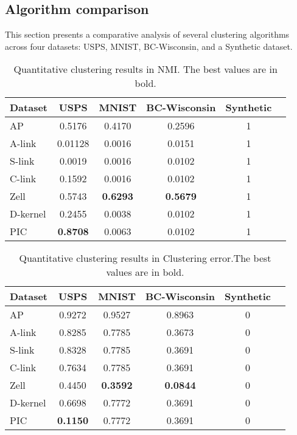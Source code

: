 \documentclass[
	10pt,
	parskip=half-,	
	paper=a4,
	english
	]{scrartcl}
\begin{document}
\subsection{Algorithm comparison}

This section presents a comparative analysis of several clustering algorithms across four datasets: USPS, MNIST, BC-Wisconsin, and a Synthetic dataset.

\begin{table}[h]
    \centering
    \caption{Quantitative clustering results in NMI. The best values are in bold.}
    \begin{tabular}{lccccc}
    \toprule
    \textbf{Dataset} & \textbf{USPS} & \textbf{MNIST} & \textbf{BC-Wisconsin} & \textbf{Synthetic}\\
    \midrule
    AP       & 0.5176   & 0.4170 & 0.2596  & 1 \\
    A-link   & 0.01128  & 0.0016 & 0.0151  & 1   \\
    S-link   & 0.0019   & 0.0016 & 0.0102  & 1 \\
    C-link   & 0.1592   & 0.0016 & 0.0102  & 1 \\
    Zell     & 0.5743   & \textbf{0.6293} & \textbf{0.5679}  & 1 \\
    D-kernel & 0.2455   & 0.0038 & 0.0102  & 1 \\
    PIC & \textbf{0.8708} & 0.0063 & 0.0102 & 1 \\
    \bottomrule
    \end{tabular}
\end{table}

\begin{table}[h]
    \centering
    \caption{Quantitative clustering results in Clustering error.The best values are in bold.}
    \begin{tabular}{lccccc}
    \toprule
    \textbf{Dataset} & \textbf{USPS} & \textbf{MNIST} & \textbf{BC-Wisconsin} & \textbf{Synthetic}\\
    \midrule
    AP       & 0.9272   & 0.9527 & 0.8963  & 0 \\
    A-link   & 0.8285  & 0.7785 & 0.3673  & 0   \\
    S-link   & 0.8328   & 0.7785 & 0.3691  & 0 \\
    C-link   & 0.7634   & 0.7785 & 0.3691  & 0 \\
    Zell     & 0.4450   & \textbf{0.3592} & \textbf{0.0844}  & 0 \\
    D-kernel & 0.6698   & 0.7772 & 0.3691  & 0 \\
    PIC & \textbf{0.1150} & 0.7772 & 0.3691 & 0 \\
    \bottomrule
    \end{tabular}
\end{table}
\end{document}
